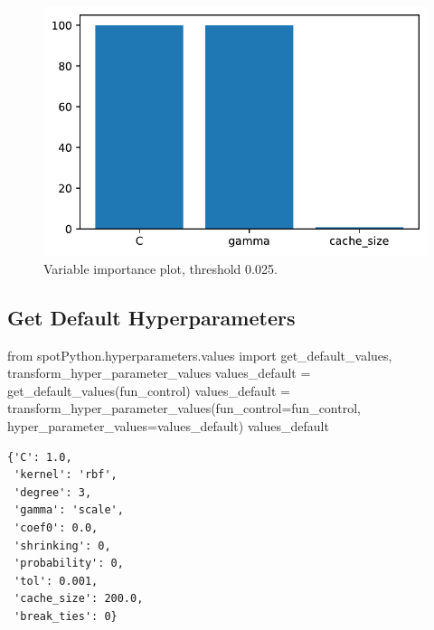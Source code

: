\documentclass[
  letterpaper,
  DIV=11,
  numbers=noendperiod]{scrreprt}
\newenvironment{Shaded}{\begin{snugshade}}{\end{snugshade}}
\newcommand{\ImportTok}[1]{\textcolor[rgb]{0.00,0.46,0.62}{#1}}
\newcommand{\NormalTok}[1]{\textcolor[rgb]{0.00,0.23,0.31}{#1}}
\newcommand{\OperatorTok}[1]{\textcolor[rgb]{0.37,0.37,0.37}{#1}}
\begin{document}
\begin{figure}[H]

{\centering \includegraphics{18_spot_hpt_sklearn_multiclass_classification_svc_files/figure-pdf/cell-28-output-1.pdf}

}

\caption{Variable importance plot, threshold 0.025.}

\end{figure}

\hypertarget{get-default-hyperparameters-5}{%
\subsection{Get Default
Hyperparameters}\label{get-default-hyperparameters-5}}

\begin{Shaded}
\begin{Highlighting}[]
\ImportTok{from}\NormalTok{ spotPython.hyperparameters.values }\ImportTok{import}\NormalTok{ get\_default\_values, transform\_hyper\_parameter\_values}
\NormalTok{values\_default }\OperatorTok{=}\NormalTok{ get\_default\_values(fun\_control)}
\NormalTok{values\_default }\OperatorTok{=}\NormalTok{ transform\_hyper\_parameter\_values(fun\_control}\OperatorTok{=}\NormalTok{fun\_control, hyper\_parameter\_values}\OperatorTok{=}\NormalTok{values\_default)}
\NormalTok{values\_default}
\end{Highlighting}
\end{Shaded}

\begin{verbatim}
{'C': 1.0,
 'kernel': 'rbf',
 'degree': 3,
 'gamma': 'scale',
 'coef0': 0.0,
 'shrinking': 0,
 'probability': 0,
 'tol': 0.001,
 'cache_size': 200.0,
 'break_ties': 0}
\end{verbatim}
\end{document}
